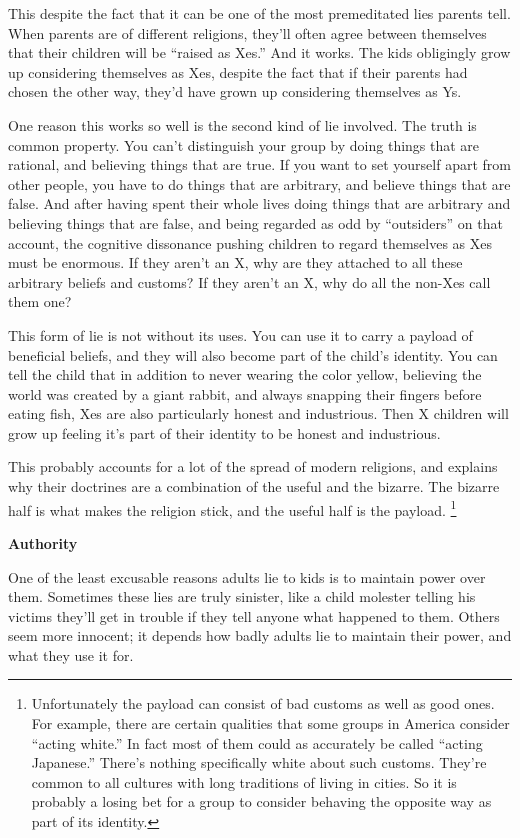 This despite the fact that it can be one of the most premeditated lies
parents tell. When parents are of different religions, they'll often
agree between themselves that their children will be ``raised as Xes.''
And it works. The kids obligingly grow up considering themselves as Xes,
despite the fact that if their parents had chosen the other way, they'd
have grown up considering themselves as Ys.

One reason this works so well is the second kind of lie involved. The
truth is common property. You can't distinguish your group by doing
things that are rational, and believing things that are true. If you
want to set yourself apart from other people, you have to do things that
are arbitrary, and believe things that are false. And after having spent
their whole lives doing things that are arbitrary and believing things
that are false, and being regarded as odd by ``outsiders'' on that
account, the cognitive dissonance pushing children to regard themselves
as Xes must be enormous. If they aren't an X, why are they attached to
all these arbitrary beliefs and customs? If they aren't an X, why do all
the non-Xes call them one?

This form of lie is not without its uses. You can use it to carry a
payload of beneficial beliefs, and they will also become part of the
child's identity. You can tell the child that in addition to never
wearing the color yellow, believing the world was created by a giant
rabbit, and always snapping their fingers before eating fish, Xes are
also particularly honest and industrious. Then X children will grow up
feeling it's part of their identity to be honest and industrious.

This probably accounts for a lot of the spread of modern religions, and
explains why their doctrines are a combination of the useful and the
bizarre. The bizarre half is what makes the religion stick, and the
useful half is the payload. \footnote{Unfortunately the payload can consist of bad customs as well as
good ones. For example, there are certain qualities that some groups in
America consider ``acting white.'' In fact most of them could as
accurately be called ``acting Japanese.'' There's nothing specifically
white about such customs. They're common to all cultures with long
traditions of living in cities. So it is probably a losing bet for a
group to consider behaving the opposite way as part of its identity.}

\textbf{Authority}

One of the least excusable reasons adults lie to kids is to maintain
power over them. Sometimes these lies are truly sinister, like a child
molester telling his victims they'll get in trouble if they tell anyone
what happened to them. Others seem more innocent; it depends how badly
adults lie to maintain their power, and what they use it for.

